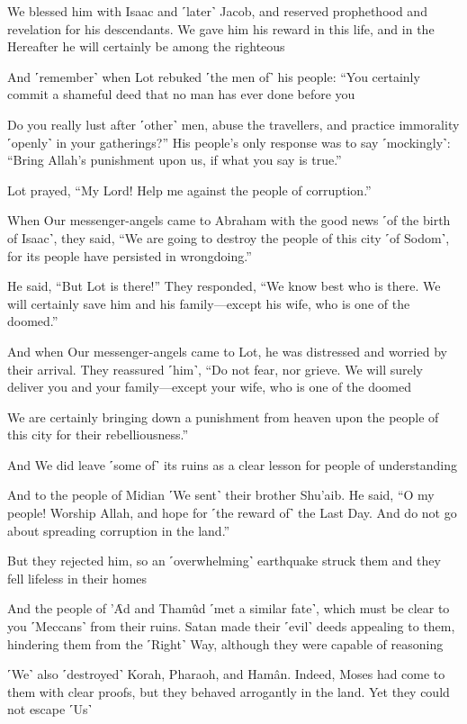 We blessed him with Isaac and ˹later˺ Jacob, and reserved prophethood and revelation for his descendants. We gave him his reward in this life, and in the Hereafter he will certainly be among the righteous

And ˹remember˺ when Lot rebuked ˹the men of˺ his people: “You certainly commit a shameful deed that no man has ever done before you

Do you really lust after ˹other˺ men, abuse the travellers, and practice immorality ˹openly˺ in your gatherings?” His people’s only response was to say ˹mockingly˺: “Bring Allah’s punishment upon us, if what you say is true.”

Lot prayed, “My Lord! Help me against the people of corruption.”

When Our messenger-angels came to Abraham with the good news ˹of the birth of Isaac˺, they said, “We are going to destroy the people of this city ˹of Sodom˺, for its people have persisted in wrongdoing.”

He said, “But Lot is there!” They responded, “We know best who is there. We will certainly save him and his family—except his wife, who is one of the doomed.”

And when Our messenger-angels came to Lot, he was distressed and worried by their arrival. They reassured ˹him˺, “Do not fear, nor grieve. We will surely deliver you and your family—except your wife, who is one of the doomed

We are certainly bringing down a punishment from heaven upon the people of this city for their rebelliousness.”

And We did leave ˹some of˺ its ruins as a clear lesson for people of understanding

And to the people of Midian ˹We sent˺ their brother Shu’aib. He said, “O my people! Worship Allah, and hope for ˹the reward of˺ the Last Day. And do not go about spreading corruption in the land.”

But they rejected him, so an ˹overwhelming˺ earthquake struck them and they fell lifeless in their homes

And the people of ’Ȃd and Thamûd ˹met a similar fate˺, which must be clear to you ˹Meccans˺ from their ruins. Satan made their ˹evil˺ deeds appealing to them, hindering them from the ˹Right˺ Way, although they were capable of reasoning

˹We˺ also ˹destroyed˺ Korah, Pharaoh, and Hamân. Indeed, Moses had come to them with clear proofs, but they behaved arrogantly in the land. Yet they could not escape ˹Us˺

